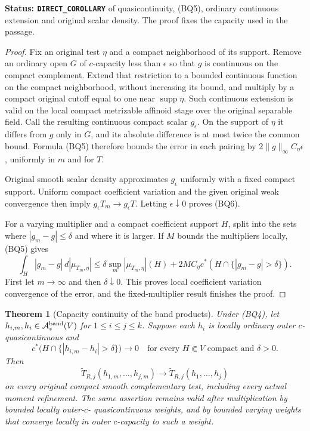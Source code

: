 \documentclass[11pt,a4paper]{article}
\numberwithin{equation}{section}
\newtheorem{theorem}{Theorem}[section]
\theoremstyle{definition}
\theoremstyle{remark}
\begin{document}
\noindent\textbf{Status: \texttt{DIRECT\_COROLLARY}} of
quasicontinuity, (BQ5), ordinary continuous extension and original
scalar density. The proof fixes the capacity used in the passage.

\begin{proof}
Fix an original test $\eta$ and a compact neighborhood of its
support. Remove an ordinary open $G$ of $c$-capacity less than
$\epsilon$ so that $g$ is continuous on the compact complement.
Extend that restriction to a bounded continuous function on the
compact neighborhood, without increasing its bound, and multiply
by a compact original cutoff equal to one near
$\operatorname{supp}\eta$. Such continuous extension is valid
on the local compact metrizable affinoid stage over the original
separable field. Call the resulting continuous compact scalar
$g_\epsilon$. On the support of $\eta$ it differs from $g$
only in $G$, and its absolute difference is at most twice the
common bound. Formula (BQ5) therefore bounds the error in each
pairing by $2\|g\|_\infty C_\eta\epsilon$, uniformly in $m$
and for $T$.

Original smooth scalar density approximates $g_\epsilon$
uniformly with a fixed compact support. Uniform compact
coefficient variation and the given original weak convergence
then imply $g_\epsilon T_m\to g_\epsilon T$.
Letting $\epsilon\downarrow0$ proves (BQ6).

For a varying multiplier and a compact coefficient support $H$,
split into the sets where $|g_m-g|\leq\delta$ and where it is
larger. If $M$ bounds the multipliers locally, (BQ5) gives
\[
 \int_H|g_m-g|\,d|\mu_{T_m,\eta}|
 \leq\delta\sup_m|\mu_{T_m,\eta}|(H)
       +2M C_\eta c^*(H\cap\{|g_m-g|>\delta\}).
 \tag{BQ7}
\]
First let $m\to\infty$ and then $\delta\downarrow0$.
This proves local coefficient variation convergence of the
error, and the fixed-multiplier result finishes the proof.
\end{proof}

\begin{theorem}[Capacity continuity of the band products]
\label{thm:r12-band-capacity-continuity}
Under (BQ4), let $h_{i,m},h_i\in\mathcal A_s^{\rm band}(V)$
for $1\leq i\leq j\leq k$. Suppose each $h_i$ is locally
ordinary outer $c$-quasicontinuous and
\[
 c^*\bigl(H\cap\{|h_{i,m}-h_i|>\delta\}\bigr)\longrightarrow0
 \quad\text{for every }H\Subset V\text{ compact and }\delta>0.
 \tag{BQ8}
\]
Then
\[
 \widetilde T_{R,j}(h_{1,m},\ldots,h_{j,m})
       \longrightarrow\widetilde T_{R,j}(h_1,\ldots,h_j)
 \tag{BQ9}
\]
on every original compact smooth complementary test, including
every actual moment refinement. The same assertion remains
valid after multiplication by bounded locally outer-$c$-
quasicontinuous weights, and by bounded varying weights that
converge locally in outer $c$-capacity to such a weight.
\end{theorem}
\end{document}
